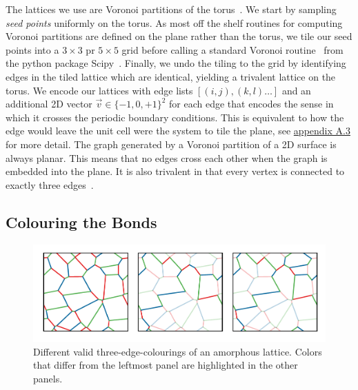 The lattices we use are Voronoi partitions of the torus~\autocite{mitchellAmorphousTopologicalInsulators2018,marsalTopologicalWeaireThorpeModels2020,florescu_designer_2009}. We start by sampling \emph{seed points} uniformly on the torus. As most off the shelf routines for computing Voronoi partitions are defined on the plane rather than the torus, we tile our seed points into a \(3\times3\) pr \(5\times5\) grid before calling a standard Voronoi routine~\autocite{barberQuickhullAlgorithmConvex1996} from the python package Scipy~\autocite{virtanenSciPyFundamentalAlgorithms2020}. Finally, we undo the tiling to the grid by identifying edges in the tiled lattice which are identical, yielding a trivalent lattice on the torus. We encode our lattices with edge lists \([(i,j), (k,l)\ldots]\) and an additional 2D vector \(\vec{v} \in \{-1,0,+1\}^2\) for each edge that encodes the sense in which it crosses the periodic boundary conditions. This is equivalent to how the edge would leave the unit cell were the system to tile the plane, see \protect\hyperlink{app-lattice-generation}{appendix A.3} for more detail. The graph generated by a Voronoi partition of a 2D surface is always planar. This means that no edges cross each other when the graph is embedded into the plane. It is also trivalent in that every vertex is connected to exactly three edges~\autocite{voronoiNouvellesApplicationsParamètres1908,watsonComputingNdimensionalDelaunay1981}.

\hypertarget{colouring-the-bonds}{%
\subsection{Colouring the Bonds}\label{colouring-the-bonds}}

\hypertarget{fig:multiple_colourings}{%
\begin{figure}
\centering
\includegraphics[width=1\textwidth,height=\textheight]{figure_code/amk_chapter/multiple_colourings/multiple_colourings}
\caption[{Colourings of an Amorphous Lattice}]{Different valid three-edge-colourings of an amorphous lattice. Colors that differ from the leftmost panel are highlighted in the other panels.}
\label{fig:multiple_colourings}
\end{figure}
}

